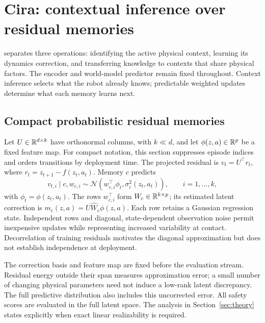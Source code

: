\section{Cira: contextual inference over residual memories}\label{sec:method}
\method{} separates three operations: identifying the active physical context, learning its dynamics correction, and transferring knowledge to contexts that share physical factors. The encoder and world-model predictor remain fixed throughout. Context inference selects what the robot already knows; predictable weighted updates determine what each memory learns next.

\subsection{Compact probabilistic residual memories}
Let $U\in\mathbb{R}^{d\times k}$ have orthonormal columns, with $k\ll d$, and let $\phi(z,a)\in\mathbb{R}^p$ be a fixed feature map. For compact notation, this section suppresses episode indices and orders transitions by deployment time. The projected residual is $v_t=U^\top r_t$, where $r_t=z_{t+1}-f(z_t,a_t)$. Memory $c$ predicts
\begin{equation}\label{eq:adapter}
 v_{t,i}\mid c,w_{c,i}\sim\mathcal N\!\left(w_{c,i}^{\top}\phi_t,\sigma_i^2(z_t,a_t)\right),
 \qquad i=1,\ldots,k,
\end{equation}
with $\phi_t=\phi(z_t,a_t)$. The rows $w_{c,i}^{\top}$ form $W_c\in\mathbb{R}^{k\times p}$; its estimated latent correction is $m_c(z,a)=U\widehat W_c\phi(z,a)$. Each row retains a Gaussian regression state. Independent rows and diagonal, state-dependent observation noise permit inexpensive updates while representing increased variability at contact. Decorrelation of training residuals motivates the diagonal approximation but does not establish independence at deployment.

The correction basis and feature map are fixed before the evaluation stream. Residual energy outside their span measures approximation error; a small number of changing physical parameters need not induce a low-rank latent discrepancy. The full predictive distribution also includes this uncorrected error. All safety scores are evaluated in the full latent space. The analysis in Section~\ref{sec:theory} states explicitly when exact linear realizability is required.

